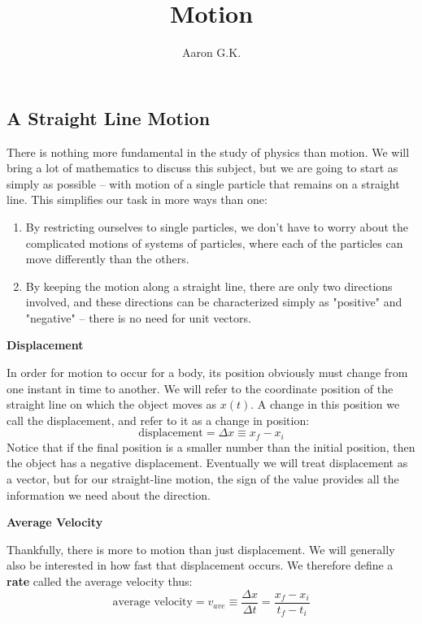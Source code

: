 \documentclass[12pt,addpoints]{exam}
\title{Motion}
\author{Aaron G.K.}
\begin{document}
	\maketitle
	\begin{center}
		\subsection*{A Straight Line Motion}
	\end{center}
	There is nothing more fundamental in the study of physics than motion. We will bring a lot of mathematics to discuss this subject, but we are going to start as simply as possible – with motion of a single particle that remains on a straight line. This simplifies our task in more ways than one:
	\begin{enumerate}
		\item By restricting ourselves to single particles, we don't have to worry about the complicated motions of systems of particles, where each of the particles can move differently than the others.
		\item By keeping the motion along a straight line, there are only two directions involved, and these directions can be characterized simply as "positive" and "negative" – there is no need for unit vectors.
	\end{enumerate}
	\begin{center}
		\textbf{Displacement}
	\end{center}
	In order for motion to occur for a body, its position obviously must change from one instant in time to another. We will refer to the coordinate position of the straight line on which the object moves as $x(t)$. A change in this position we call the displacement, and refer to it as a change in position:
	$$\text{displacement} = \Delta x \equiv x_f - x_i$$
	Notice that if the final position is a smaller number than the initial position, then the object has a negative displacement. Eventually we will treat displacement as a vector, but for our straight-line motion, the sign of the value provides all the information we need about the direction. 
 	\begin{center}\textbf{Average Velocity}	 \end{center}
	Thankfully, there is more to motion than just displacement. We will generally also be interested in how fast that displacement occurs. We therefore define a \textbf{rate} called the average velocity thus:
	$$\text{average velocity} = v_{ave} \equiv \dfrac{\Delta x}{\Delta t} = \dfrac{x_f-x_i}{t_f-t_i}$$
\end{document}
